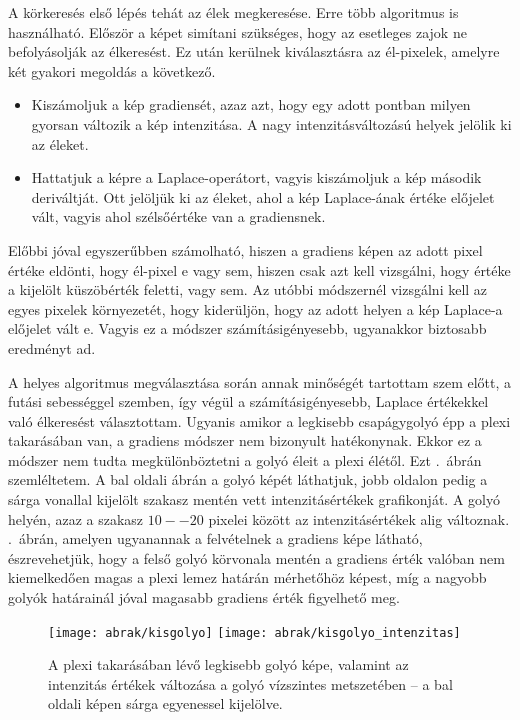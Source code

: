 \documentclass[a4paper,12pt]{article}
\begin{document}
A körkeresés  első lépés tehát az élek megkeresése. Erre több algoritmus is használható. Először a képet simítani szükséges, hogy az esetleges zajok ne befolyásolják az élkeresést. Ez után kerülnek kiválasztásra az él-pixelek, amelyre  két gyakori megoldás a következő.

\begin{itemize}
\item Kiszámoljuk a kép gradiensét, azaz azt, hogy egy adott pontban milyen gyorsan változik a kép intenzitása. A nagy intenzitásváltozású helyek jelölik ki az éleket.

\item Hattatjuk a képre a Laplace-operátort, vagyis kiszámoljuk a kép második deriváltját. Ott jelöljük ki az éleket, ahol a kép Laplace-ának  értéke előjelet vált, vagyis ahol szélsőértéke van a gradiensnek.

\end{itemize}

Előbbi jóval egyszerűbben számolható, hiszen a gradiens képen az adott pixel értéke eldönti, hogy él-pixel e vagy sem, hiszen csak azt kell vizsgálni, hogy értéke a kijelölt küszöbérték feletti, vagy sem. Az utóbbi módszernél vizsgálni kell az egyes pixelek környezetét, hogy kiderüljön, hogy az adott helyen a kép Laplace-a előjelet vált e. Vagyis ez a módszer számításigényesebb, ugyanakkor biztosabb eredményt ad.

A helyes algoritmus megválasztása során annak minőségét tartottam szem előtt, a futási sebességgel szemben, így végül a számításigényesebb, Laplace értékekkel való  élkeresést választottam. Ugyanis amikor a legkisebb csapágygolyó épp a plexi takarásában van, a gradiens módszer nem bizonyult hatékonynak. Ekkor ez a módszer nem tudta megkülönböztetni a golyó éleit a plexi élétől. Ezt .~ábrán szemléltetem. A bal oldali ábrán a golyó képét láthatjuk, jobb oldalon pedig a sárga vonallal kijelölt szakasz mentén vett intenzitásértékek grafikonját. A golyó helyén, azaz a szakasz $10--20$ pixelei között az intenzitásértékek alig változnak.    .~ábrán, amelyen ugyanannak a felvételnek a gradiens képe látható, észrevehetjük, hogy a felső golyó körvonala mentén a gradiens érték valóban nem kiemelkedően magas a plexi lemez határán mérhetőhöz képest, míg a nagyobb golyók határainál jóval magasabb gradiens érték figyelhető meg.  

\begin{figure}[htbp]
\center
\texttt{[image: abrak/kisgolyo]}
\texttt{[image: abrak/kisgolyo\_intenzitas]}
\caption{A plexi takarásában lévő legkisebb golyó képe, valamint az intenzitás értékek változása a golyó vízszintes metszetében -- a bal oldali képen sárga egyenessel kijelölve.}
\label{fig:kisgolyo1}
\end{figure}
\end{document}
